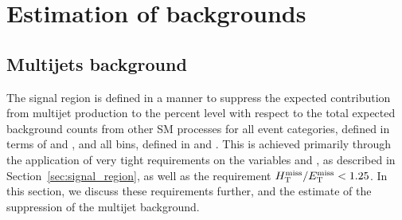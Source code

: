 \section{Estimation of backgrounds}
\label{sec:backgrounds}

\subsection{Multijets background}
\label{sec:qcd_background}

The signal region is defined in a manner to suppress the expected
contribution from multijet production to the percent level with
respect to the total expected background counts from other SM
processes for all event categories, defined in terms of \njet and \nb,
and all bins, defined in \scalht and \HTmiss. This is achieved
primarily through the application of very tight requirements on the
variables \alphat and \dphi, as described in
Section~\ref{sec:signal_region}, as well as the requirement $\mhtmet <
1.25$. In this section, we discuss these requirements further, and the
estimate of the suppression of the multijet background.


